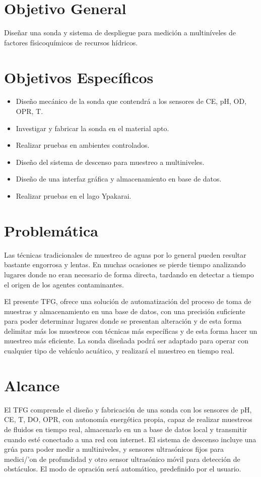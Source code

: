 \section{Objetivo General}
Dise\~nar una sonda y sistema de despliegue para medici\'on a multin\'iveles de factores f\'isicoqu\'imicos de recursos h\'idricos.
\section{Objetivos Específicos}

\begin{itemize}
	\item Dise\~no mec\'anico de la sonda que contendr\'a a los sensores de CE, pH, OD, OPR, T.
    \item Investigar y fabricar  la sonda en el material apto.
    \item Realizar pruebas en ambientes controlados.
    \item Dise\~no del sistema de descenso para muestreo a multiniveles.
    \item Dise\~no de una interfaz gr\'afica y almacenamiento en base de datos.  
    \item Realizar pruebas en el lago Ypakarai.

\end{itemize}

\section{Problem\'atica} 

Las t\'ecnicas tradicionales de muestreo de aguas por lo general pueden resultar bastante engorrosa y lentas. En muchas ocasiones se pierde tiempo analizando lugares donde no eran necesario de forma directa, tardando en detectar a tiempo el origen de los agentes contaminantes.  
 
El presente TFG, ofrece una soluci\'on de automatizaci\'on del proceso de toma de muestras y almacenamiento en una base de datos, con una precisi\'on suficiente para poder determinar lugares donde se presentan alteraci\'on y de esta forma delimitar m\'as los muestreos con t\'ecnicas más espec\'ificas y de esta forma hacer un muestreo más eficiente.
La sonda diseñada podr\'a ser adaptado para operar con cualquier tipo de vehículo acu\'atico, y realizar\'a el muestreo en tiempo real.  

\section{Alcance}
El TFG comprende el dise\~no y fabricaci\'on de una sonda con los sensores de pH, CE, T, DO, OPR, con autonom\'ia energ\'etica propia, capaz de realizar muestreos de fluidos en tiempo real, almacenarlo en un a base de datos local y transmitir cuando esté conectado a una red con internet. 
El sistema de descenso incluye una gr\'ua para poder medir a multiniveles, y sensores ultras\'onicos fijos para medici/'on de profundidad y otro sensor ultras\'onico m\'ovil para detección de obst\'aculos.  
El modo de opraci\'on será autom\'atico, predefinido por el usuario.


